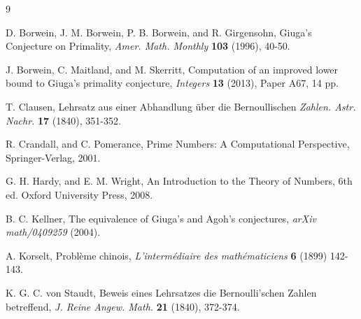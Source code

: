 \documentclass[reqno,a4paper,11pt]{amsart}
\numberwithin{equation}{section}
\theoremstyle{definition}
\begin{document}
\begin{thebibliography}{9}

D. Borwein, J. M. Borwein, P. B. Borwein, and R. Girgensohn, 
Giuga's Conjecture on Primality,
\textit{ Amer. Math. Monthly} 
\textbf{103} (1996), 40-50.

J. Borwein, C. Maitland,  and M. Skerritt,   
Computation of an improved lower bound to Giuga's primality conjecture, 
\textit{Integers}
\textbf{13} (2013), Paper A67, 14 pp.

T. Clausen,  
Lehrsatz aus einer Abhandlung \"uber die Bernoullischen 
\textit{Zahlen. Astr. Nachr.} 
\textbf{17} (1840), 351-352.

R. Crandall, and C.  Pomerance,  
Prime Numbers: A Computational Perspective, 
Springer-Verlag, 2001.

G. H. Hardy, and  E. M. Wright,   
An Introduction to the Theory of Numbers, 6th ed. Oxford University Press, 2008.



B. C. Kellner,  
The equivalence of Giuga's and Agoh's conjectures, 
\textit{arXiv  math/0409259} 
(2004).


A. Korselt,   
Probl\`eme chinois,  
\textit{L'interm\'ediaire des math\'ematiciens} 
\textbf{6} (1899)  142-143.

K. G. C. von Staudt,  
Beweis eines Lehrsatzes die Bernoulli'schen Zahlen betreffend, 
\textit{J. Reine Angew. Math.} 
\textbf{21} 
(1840), 
372-374.

\end{thebibliography}
\end{document}
